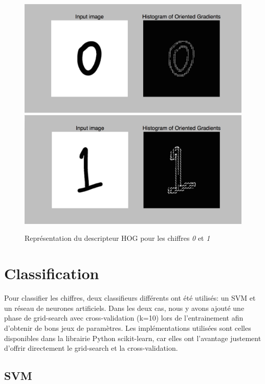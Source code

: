 \begin{figure}[!h]
\includegraphics[width=\textwidth]{pictures/hog0}
\includegraphics[width=\textwidth]{pictures/hog1}
\caption{Représentation du descripteur HOG pour les chiffres \emph{0} et \emph{1}}
\label{fig:hog}
\end{figure}

\section{Classification}

Pour classifier les chiffres, deux classifieurs différents ont été utilisés: un SVM et un réseau de neurones artificiels. Dans les deux cas, nous y avons ajouté une phase de grid-search avec cross-validation (k=10) lors de l'entrainement afin d'obtenir de bons jeux de paramètres. Les implémentations utilisées sont celles disponibles dans la librairie Python scikit-learn, car elles ont l'avantage justement d'offrir directement le grid-search et la cross-validation.

\subsection{SVM}

